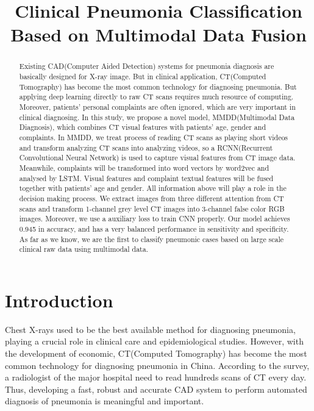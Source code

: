 \documentclass[runningheads]{llncs}
\begin{document}
%
\title{Clinical Pneumonia Classification Based on Multimodal Data Fusion}
%
%
\author{
}
%
\authorrunning{}
%
\institute{
}
%
\maketitle              %
%
\begin{abstract}
Existing CAD(Computer Aided Detection) systems for pneumonia diagnosis are basically designed for X-ray image. But in clinical application, CT(Computed Tomography) has become the most common technology for diagnosing pneumonia. But applying deep learning directly to raw CT scans requires much resource of computing. Moreover, patients' personal complaints are often ignored, which are very important in clinical diagnosing.
In this study, we propose a novel model, MMDD(Multimodal Data Diagnosis), which combines CT visual features with patients' age, gender and complaints. In MMDD, we treat process of reading CT scans as playing short videos and transform analyzing CT scans into analyzing videos, so a RCNN(Recurrent Convolutional Neural Network) is used to capture visual features from CT image data. Meanwhile, complaints will be transformed into word vectors by word2vec and analysed by LSTM. Visual features and complaint textual features will be fused together with patients' age and gender. All information above will play a role in the decision making process.
We extract images from three different attention from CT scans and transform 1-channel grey level CT images into 3-channel false color RGB images. Moreover, we use a auxiliary loss to train CNN properly. Our model achieves 0.945 in accuracy, and has a very balanced performance in sensitivity and specificity. As far as we know, we are the first to classify pneumonic cases based on large scale clinical raw data using multimodal data.


\end{abstract}

\section{Introduction}
Chest X-rays used to be the best available method for diagnosing pneumonia, playing a crucial role in clinical care\cite{Franquet2001Imaging} and epidemiological studies\cite{Thomas2005Standardized}. However, with the development of economic, CT(Computed Tomography) has become the most common technology for diagnosing pneumonia in China. According to the survey, a radiologist of the major hospital need to read hundreds scans of CT every day. Thus, developing a fast, robust and accurate CAD system to perform automated diagnosis of pneumonia is meaningful and important. 
\end{document}
